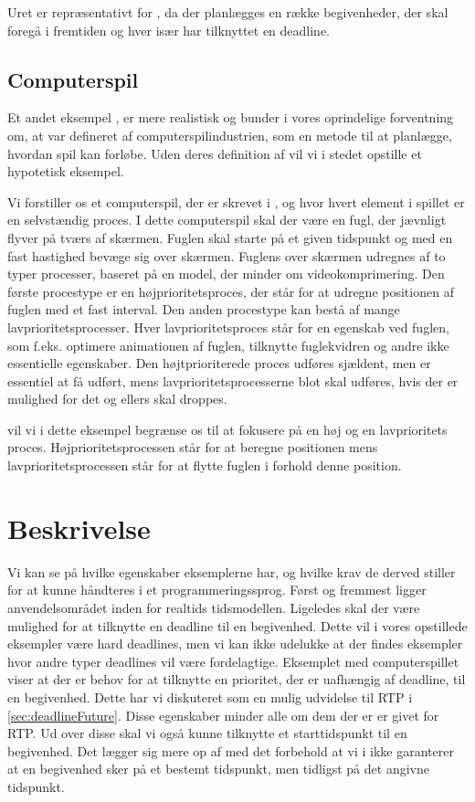 Uret er repræsentativt for \is, da der planlægges en række begivenheder, der skal foregå i fremtiden og hver især har tilknyttet en deadline.

\subsection{Computerspil}
Et andet eksempel , er mere realistisk og bunder i vores oprindelige forventning om, at \is  var defineret af computerspilindustrien, som en metode til at planlægge, hvordan spil kan forløbe. Uden deres definition af \is vil vi i stedet opstille et hypotetisk eksempel. 

Vi forstiller os et computerspil, der er skrevet i \pycsp, og hvor hvert element i spillet er en selvstændig proces. I dette computerspil skal der være en fugl, der jævnligt flyver på tværs af skærmen. Fuglen skal starte på et given tidspunkt og med en fast hastighed bevæge sig over skærmen. Fuglens  over skærmen udregnes af to typer processer, baseret på en model, der minder om videokomprimering. Den første procestype er en højprioritetsproces, der står for at udregne positionen af fuglen med  et fast interval. Den anden procestype kan bestå af mange lavprioritetsprocesser. Hver lavprioritetsproces står for en egenskab ved fuglen, som  f.eks. optimere animationen af fuglen, tilknytte fuglekvidren og andre ikke essentielle egenskaber. Den højtprioriterede proces udføres sjældent, men er essentiel at få udført, mens lavprioritetsprocesserne blot skal udføres, hvis der er mulighed for det og ellers skal droppes.

 vil vi i dette eksempel begrænse os til at fokusere på en høj og en lavprioritets proces. Højprioritetsprocessen står for at beregne positionen mens lavprioritetsprocessen står for at flytte fuglen i forhold denne position.

\section{Beskrivelse}
Vi kan se på hvilke egenskaber eksemplerne har, og hvilke krav de derved stiller for at kunne håndteres i et programmeringssprog. Først og fremmest ligger anvendelsområdet  inden for realtids tidsmodellen. Ligeledes skal der være mulighed for at tilknytte en deadline til en begivenhed. Dette vil i vores opstillede eksempler være hard deadlines, men vi kan ikke udelukke at der findes eksempler hvor andre typer deadlines vil være fordelagtige. Eksemplet med computerspillet viser at der er behov for at tilknytte en prioritet, der er uafhængig af deadline, til en begivenhed. Dette har vi diskuteret som en mulig udvidelse til RTP i \cref{sec:deadlineFuture}. Disse egenskaber minder alle om dem der er er givet for RTP. Ud over disse skal vi også kunne tilknytte et starttidspunkt til en begivenhed. Det lægger sig mere op af \des med det forbehold at vi i \is ikke garanterer at en begivenhed sker på et bestemt tidspunkt, men tidligst på det angivne tidspunkt.  

